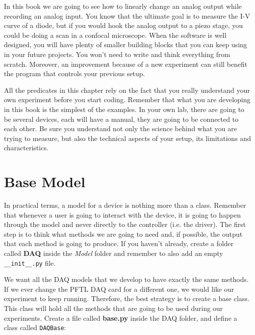 In this book we are going to see how to linearly change an analog output while recording an analog input. You know that the ultimate goal is to measure the I-V curve of a diode, but if you would hook the analog output to a piezo stage, you could be doing a scan in a confocal microscope. When the software is well designed, you will have plenty of smaller building blocks that you can keep using in your future projects. You won't need to write and think everything from scratch. Moreover, an improvement because of a new experiment can still benefit the program that controls your previous setup. 

All the predicates in this chapter rely on the fact that you really understand your own experiment before you start coding. Remember that what you are developing in this book is the simplest of the examples. In your own lab, there are going to be several devices, each will have a manual, they are going to be connected to each other. Be sure you understand not only the science behind what you are trying to measure, but also the technical aspects of your setup, its limitations and characteristics. 


\section{Base Model}\label{basemodel}
In practical terms, a model for a device is nothing more than a class. Remember that whenever a user is going to interact with the device, it is going to happen through the model and never directly to the controller (i.e. the driver). The first step is to think what methods we are going to need and, if possible, the output that each method is going to produce. If you haven't already, create a folder called \textbf{DAQ} inside the \emph{Model} folder and remember to also add an empty \texttt{\_\_init\_\_.py} file. 

We want all the DAQ models that we develop to have exactly the same methods. If we ever change the PFTL DAQ card for a different one, we would like our experiment to keep running. Therefore, the best strategy is to create a base class. This class will hold all the methods that are going to be used during our experiments. Create a file called \textbf{base.py} inside the DAQ folder, and define a class called \texttt{DAQBase}:

